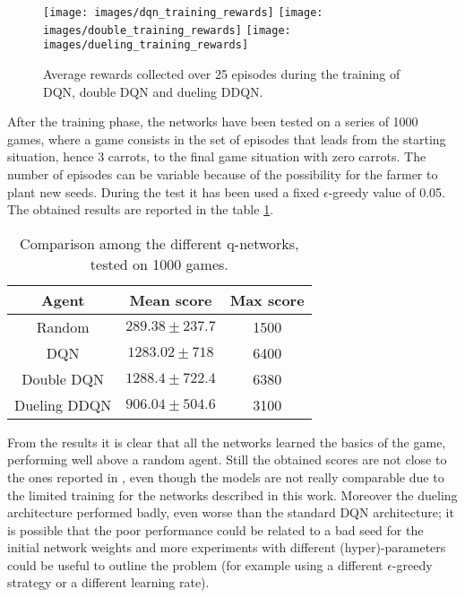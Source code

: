 \documentclass[article,11pt]{article}
\begin{document}
	\begin{figure}
		\texttt{[image: images/dqn\_training\_rewards]}
		\endminipage\hfill
		\texttt{[image: images/double\_training\_rewards]}
		\endminipage\hfill
		\texttt{[image: images/dueling\_training\_rewards]}
		\endminipage
		\caption{Average rewards collected over 25 episodes during the training of DQN, double DQN and dueling DDQN.}
		\label{fig:average_reward}
	\end{figure}


	After the training phase, the networks have been tested on a series of 1000 games, where a game consists in the set of episodes that leads from the starting situation, hence 3 carrots, to the final game situation with zero carrots. The number of episodes can be variable because of the possibility for the farmer to plant new seeds. During the test it has been used a fixed $\epsilon$-greedy value of 0.05.
	The obtained results are reported in the table \ref{tab:test}.
	\begin{table}
		\centering
		\begin{tabular}{|c|c|c|}
			\hline
			Agent	& Mean score & Max score\\
			\hline
			Random & $289.38 \pm 237.7$ & 1500 \\
			DQN & $1283.02 \pm 718$ & 6400\\
			Double DQN & $1288.4 \pm 722.4$ & 6380 \\
			Dueling DDQN & $906.04 \pm 504.6$ & 3100 \\
			\hline
		\end{tabular}
		\caption{Comparison among the different q-networks, tested on 1000 games.}
		\label{tab:test}
	\end{table}

	From the results it is clear that all the networks learned the basics of the game, performing well above a random agent. Still the obtained scores are not close to the ones reported in \cite{combined_dqn}, even though the models are not really comparable due to the limited training for the networks described in this work. Moreover the dueling architecture performed badly, even worse than the standard DQN architecture; it is possible that the poor performance could be related to a bad seed for the initial network weights and more experiments with different (hyper)-parameters could be useful to outline the problem (for example using a different $\epsilon$-greedy strategy or a different learning rate).
	
\end{document}
